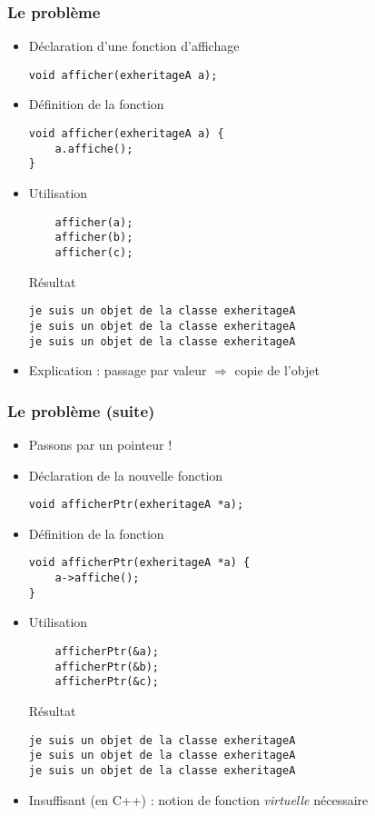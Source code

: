 \begin{frame}[fragile]
\frametitle{Le problème}
\begin{itemize}
\item Déclaration d'une fonction d'affichage
\begin{lstlisting}
void afficher(exheritageA a);
\end{lstlisting}
\item Définition de la fonction
\begin{lstlisting}
void afficher(exheritageA a) {
    a.affiche();
}
\end{lstlisting}
\item Utilisation
\begin{lstlisting}
    afficher(a);
    afficher(b);
    afficher(c);
\end{lstlisting}
\pause\begin{block}{Résultat}
{\tiny
\begin{verbatim}
je suis un objet de la classe exheritageA
je suis un objet de la classe exheritageA
je suis un objet de la classe exheritageA
\end{verbatim}
}
\end{block}
\pause
\item Explication : passage par valeur $\Longrightarrow$ copie de l'objet
\end{itemize}
\end{frame}

\begin{frame}[fragile]
\frametitle{Le problème (suite)}
\begin{itemize}
\item Passons par un pointeur !
\item Déclaration de la nouvelle fonction
\begin{lstlisting}
void afficherPtr(exheritageA *a);
\end{lstlisting}
\item Définition de la fonction
\begin{lstlisting}
void afficherPtr(exheritageA *a) {
    a->affiche();
}
\end{lstlisting}
\item Utilisation
\begin{lstlisting}
    afficherPtr(&a);
    afficherPtr(&b);
    afficherPtr(&c);
\end{lstlisting}
\pause\begin{block}{Résultat}
{\tiny
\begin{verbatim}
je suis un objet de la classe exheritageA
je suis un objet de la classe exheritageA
je suis un objet de la classe exheritageA
\end{verbatim}
}
\end{block}
\pause
\item Insuffisant (en C++) : notion de fonction \textit{virtuelle} nécessaire
\end{itemize}
\end{frame}

